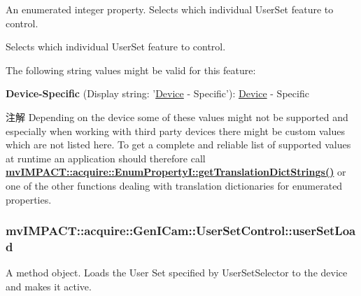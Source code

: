 An enumerated integer property. Selects which individual User\+Set feature to control. 

Selects which individual User\+Set feature to control.

The following string values might be valid for this feature\+:
\begin{DoxyItemize}
\item {\bfseries Device-\/\+Specific} (Display string\+: '\hyperlink{classmv_i_m_p_a_c_t_1_1acquire_1_1_device}{Device} -\/ Specific')\+: \hyperlink{classmv_i_m_p_a_c_t_1_1acquire_1_1_device}{Device} -\/ Specific
\end{DoxyItemize}

\begin{DoxyNote}{注解}
Depending on the device some of these values might not be supported and especially when working with third party devices there might be custom values which are not listed here. To get a complete and reliable list of supported values at runtime an application should therefore call {\bfseries \hyperlink{classmv_i_m_p_a_c_t_1_1acquire_1_1_enum_property_i_a0ba6ccbf5ee69784d5d0b537924d26b6}{mv\+I\+M\+P\+A\+C\+T\+::acquire\+::\+Enum\+Property\+I\+::get\+Translation\+Dict\+Strings()}} or one of the other functions dealing with translation dictionaries for enumerated properties. 
\end{DoxyNote}
\hypertarget{classmv_i_m_p_a_c_t_1_1acquire_1_1_gen_i_cam_1_1_user_set_control_a2adba0f27db53c0d63d7b772a41c7219}{
\subsubsection[{user\+Set\+Load}]{ mv\+I\+M\+P\+A\+C\+T\+::acquire\+::\+Gen\+I\+Cam\+::\+User\+Set\+Control\+::user\+Set\+Load}}\label{classmv_i_m_p_a_c_t_1_1acquire_1_1_gen_i_cam_1_1_user_set_control_a2adba0f27db53c0d63d7b772a41c7219}


A method object. Loads the User Set specified by User\+Set\+Selector to the device and makes it active. 

